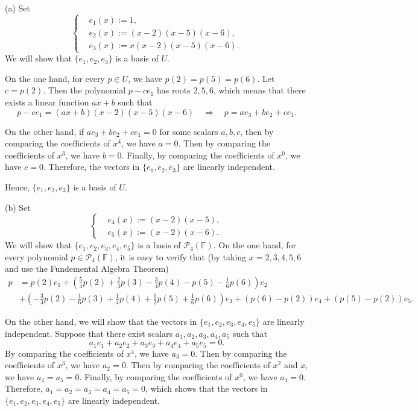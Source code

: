 \documentclass{article}
\begin{document}
\begin{solution}
    (a) Set
    \[ \begin{cases}
        &e_1(x):=1,\\
        &e_2(x):=(x-2)(x-5)(x-6),\\
        &e_3(x):=x(x-2)(x-5)(x-6).
    \end{cases} \]
    We will show that \( \{e_1, e_2, e_3\} \) is a basis of \( U \).\par
    On the one hand, for every \( p \in U \), we have \( p(2) = p(5) = p(6) \). Let \( c = p(2) \). Then the polynomial \( p - c e_1 \) has roots \( 2, 5, 6 \), which means that there exists a linear function $ ax+b $ such that
    \[ p-c e_1=(ax+b)(x-2)(x-5)(x-6)\quad\Rightarrow\quad p=a e_3+b e_2+c e_1. \] \par
    On the other hand, if \( a e_3 + b e_2 + c e_1 = 0 \) for some scalars \( a, b, c \), then by comparing the coefficients of \( x^4 \), we have \( a = 0 \). Then by comparing the coefficients of \( x^3 \), we have \( b = 0 \). Finally, by comparing the coefficients of \( x^0 \), we have \( c = 0 \). Therefore, the vectors in \( \{e_1, e_2, e_3\} \) are linearly independent. \par
    Hence, \( \{e_1, e_2, e_3\} \) is a basis of \( U \).\par
    (b) Set
    \[ \begin{cases}
        &e_4(x):=(x-2)(x-5),\\
        &e_5(x):=(x-2)(x-6).
    \end{cases} \] 
    We will show that \( \{e_1, e_2, e_3, e_4, e_5\} \) is a basis of \( \mathcal{P}_4(\mathbb{F}) \). On the one hand, for every polynomial \( p \in \mathcal{P}_4(\mathbb{F}) \), it is easy to verify that (by taking $ x=2,3,4,5,6 $ and use the Fundemental Algebra Theorem)
    \begin{align*}
    p &= p(2) e_1+\left(\frac{5}{4} p(2)+ \frac{2}{3} p(3)-\frac{3}{4}p(4)-p(5)- \frac{1}{6} p(6)\right) e_2 \\
    &+\left(-\frac{3}{4} p(2)- \frac{1}{6} p(3)+ \frac{1}{4} p(4)+ \frac{1}{2}p(5) + \frac{1}{6} p(6)\right) e_3+(p(6)-p(2)) e_4+(p(5)-p(2)) e_5. 
    \end{align*}\par
    On the other hand, we will show that the vectors in \( \{e_1, e_2, e_3, e_4, e_5\} \) are linearly independent. Suppose that there exist scalars \( a_1, a_2, a_3, a_4, a_5 \) such that
    \[ a_1 e_1 + a_2 e_2 + a_3 e_3 + a_4 e_4 + a_5 e_5 = 0. \]
    By comparing the coefficients of \( x^4 \), we have \( a_3 = 0 \). Then by comparing the coefficients of \( x^3 \), we have \( a_2 = 0 \). Then by comparing the coefficients of \( x^2 \) and \( x \), we have \( a_4 = a_5 = 0 \). Finally, by comparing the coefficients of \( x^0 \), we have \( a_1 = 0 \). Therefore, \( a_1 = a_2 = a_3 = a_4 = a_5 = 0 \), which shows that the vectors in \( \{e_1, e_2, e_3, e_4, e_5\} \) are linearly independent. \par

\end{solution}
\end{document}
